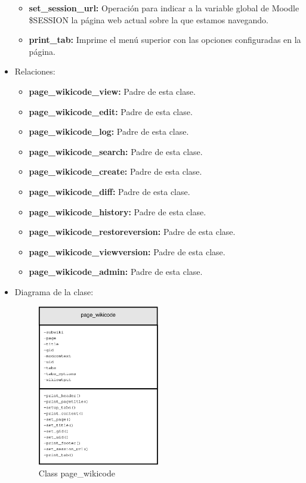 \begin{itemize}
\begin{itemize}
			\item \textbf{set\_session\_url: }Operación para indicar a la variable global de Moodle \$SESSION la página web actual sobre la que estamos navegando.
			\item \textbf{print\_tab: }Imprime el menú superior con las opciones configuradas en la página.
		\end{itemize}
	\item Relaciones:
		\begin{itemize}
			\item \textbf{page\_wikicode\_view: } Padre de esta clase.
			\item \textbf{page\_wikicode\_edit: } Padre de esta clase.
			\item \textbf{page\_wikicode\_log: } Padre de esta clase.
			\item \textbf{page\_wikicode\_search: } Padre de esta clase.
			\item \textbf{page\_wikicode\_create: } Padre de esta clase.
			\item \textbf{page\_wikicode\_diff: } Padre de esta clase.
			\item \textbf{page\_wikicode\_history: } Padre de esta clase.
			\item \textbf{page\_wikicode\_restoreversion: } Padre de esta clase.
			\item \textbf{page\_wikicode\_viewversion: } Padre de esta clase.
			\item \textbf{page\_wikicode\_admin: } Padre de esta clase.
		\end{itemize}
	\item Diagrama de la clase:
		\begin{figure}[h]
			\centering
			\includegraphics[width=0.5\textwidth]{./img/page_wikicode.eps}
			\caption{Class page\_wikicode}
		\end{figure}
\end{itemize}

